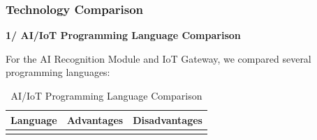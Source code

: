\documentclass[a4paper]{article}
\begin{document}
\subsubsection{Technology Comparison}

\noindent \textbf{1/ AI/IoT Programming Language Comparison}

For the AI Recognition Module and IoT Gateway, we compared several programming languages:

\begin{longtable}{@{}
    >{\raggedright\arraybackslash}p{}
    >{\raggedright\arraybackslash}p{}
    >{\raggedright\arraybackslash}p{} @{}}

    \caption{AI/IoT Programming Language Comparison}
    \label{tab:ai_lang_comparison} \\

    \toprule
    \textbf{Language} & \textbf{Advantages} & \textbf{Disadvantages} \\
    \midrule
    \endfirsthead

    \bottomrule
    \endlastfoot


\end{longtable}
\end{document}
